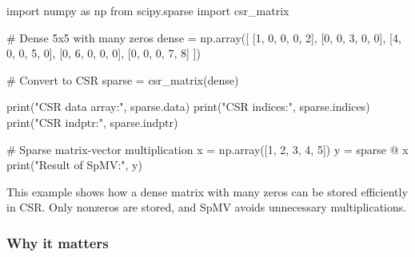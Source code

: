 \documentclass[
  letterpaper,
  DIV=11,
  numbers=noendperiod]{scrreprt}
\newenvironment{Shaded}{\begin{snugshade}}{\end{snugshade}}
\newcommand{\BuiltInTok}[1]{\textcolor[rgb]{0.00,0.23,0.31}{#1}}
\newcommand{\CommentTok}[1]{\textcolor[rgb]{0.37,0.37,0.37}{#1}}
\newcommand{\DecValTok}[1]{\textcolor[rgb]{0.68,0.00,0.00}{#1}}
\newcommand{\ImportTok}[1]{\textcolor[rgb]{0.00,0.46,0.62}{#1}}
\newcommand{\NormalTok}[1]{\textcolor[rgb]{0.00,0.23,0.31}{#1}}
\newcommand{\OperatorTok}[1]{\textcolor[rgb]{0.37,0.37,0.37}{#1}}
\newcommand{\StringTok}[1]{\textcolor[rgb]{0.13,0.47,0.30}{#1}}
\begin{document}
\begin{Shaded}
\begin{Highlighting}[]
\ImportTok{import}\NormalTok{ numpy }\ImportTok{as}\NormalTok{ np}
\ImportTok{from}\NormalTok{ scipy.sparse }\ImportTok{import}\NormalTok{ csr\_matrix}

\CommentTok{\# Dense 5x5 with many zeros}
\NormalTok{dense }\OperatorTok{=}\NormalTok{ np.array([}
\NormalTok{    [}\DecValTok{1}\NormalTok{, }\DecValTok{0}\NormalTok{, }\DecValTok{0}\NormalTok{, }\DecValTok{0}\NormalTok{, }\DecValTok{2}\NormalTok{],}
\NormalTok{    [}\DecValTok{0}\NormalTok{, }\DecValTok{0}\NormalTok{, }\DecValTok{3}\NormalTok{, }\DecValTok{0}\NormalTok{, }\DecValTok{0}\NormalTok{],}
\NormalTok{    [}\DecValTok{4}\NormalTok{, }\DecValTok{0}\NormalTok{, }\DecValTok{0}\NormalTok{, }\DecValTok{5}\NormalTok{, }\DecValTok{0}\NormalTok{],}
\NormalTok{    [}\DecValTok{0}\NormalTok{, }\DecValTok{6}\NormalTok{, }\DecValTok{0}\NormalTok{, }\DecValTok{0}\NormalTok{, }\DecValTok{0}\NormalTok{],}
\NormalTok{    [}\DecValTok{0}\NormalTok{, }\DecValTok{0}\NormalTok{, }\DecValTok{0}\NormalTok{, }\DecValTok{7}\NormalTok{, }\DecValTok{8}\NormalTok{]}
\NormalTok{])}

\CommentTok{\# Convert to CSR}
\NormalTok{sparse }\OperatorTok{=}\NormalTok{ csr\_matrix(dense)}

\BuiltInTok{print}\NormalTok{(}\StringTok{"CSR data array:"}\NormalTok{, sparse.data)}
\BuiltInTok{print}\NormalTok{(}\StringTok{"CSR indices:"}\NormalTok{, sparse.indices)}
\BuiltInTok{print}\NormalTok{(}\StringTok{"CSR indptr:"}\NormalTok{, sparse.indptr)}

\CommentTok{\# Sparse matrix{-}vector multiplication}
\NormalTok{x }\OperatorTok{=}\NormalTok{ np.array([}\DecValTok{1}\NormalTok{, }\DecValTok{2}\NormalTok{, }\DecValTok{3}\NormalTok{, }\DecValTok{4}\NormalTok{, }\DecValTok{5}\NormalTok{])}
\NormalTok{y }\OperatorTok{=}\NormalTok{ sparse }\OperatorTok{@}\NormalTok{ x}
\BuiltInTok{print}\NormalTok{(}\StringTok{"Result of SpMV:"}\NormalTok{, y)}
\end{Highlighting}
\end{Shaded}

This example shows how a dense matrix with many zeros can be stored
efficiently in CSR. Only nonzeros are stored, and SpMV avoids
unnecessary multiplications.

\subsubsection{Why it matters}\label{why-it-matters-26}
\end{document}
